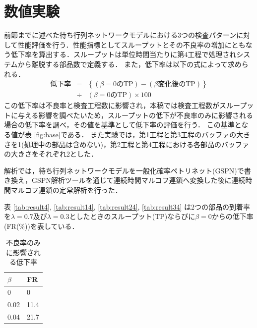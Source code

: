 \documentclass{iseman}
\begin{document}
\section{数値実験}
前節までに述べた待ち行列ネットワークモデルにおける3つの検査パターンに対して性能評価を行う．性能指標としてスループットとその不良率の増加にともなう低下率を算出する．スループットは単位時間当たりに第4工程で処理されシステムから離脱する部品数で定義する．
また，低下率は以下の式によって求められる．
\begin{eqnarray*}
\mbox{低下率} &=& \left\{ (\mbox{$\beta=0$のTP})-(\mbox{$\beta$変化後のTP}) \right\}  \\ 
&\div& (\mbox{$\beta=0$のTP}) \times 100
\end{eqnarray*}
この低下率は不良率と検査工程数に影響され，本稿では検査工程数がスループットに与える影響を調べたいため，スループットの低下が不良率のみに影響される場合の低下率を調べ，その値を基準として低下率の評価を行う．
この基準となる値が表 \ref{fig:base}である．
また実験では，第1工程と第3工程のバッファの大きさを1(処理中の部品は含めない)，第2工程と第4工程における各部品のバッファの大きさをそれぞれ2とした．

解析では，待ち行列ネットワークモデルを一般化確率ペトリネット(GSPN)で書き換え，GSPN解析ツールを通じて連続時間マルコフ連鎖へ変換した後に連続時間マルコフ連鎖の定常解析を行った．

表 \ref{tab:result4}, \ref{tab:result14}, \ref{tab:result24}, \ref{tab:result34} は2つの部品の到着率を$\lambda=0.7$及び$\lambda=0.3$としたときのスループット(TP)ならびに$\beta = 0$からの低下率(FR($\%$))を表している．

\begin{table}[ht]
	\centering
	\caption{不良率のみに影響される低下率}
		\begin{tabular}{| l | l |} \hline
			$\beta$ & FR \\ \hline
			0 & 0	\\ \hline
			0.02 & 11.4 \\ \hline
			0.04 & 21.7 \\ \hline
		\end{tabular}
	\label{tb:base}
\end{table}
\end{document}
